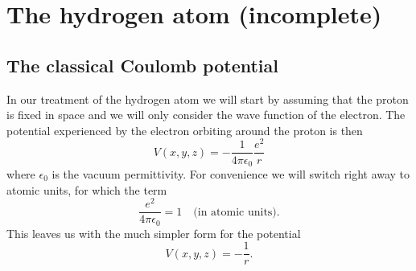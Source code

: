 \documentclass[../Main/chem331-notes.tex]{subfiles}
\begin{document}
\setcounter{section}{12}

\section{The hydrogen atom (incomplete)}
\subsection{The classical Coulomb potential}
In our treatment of the hydrogen atom we will start by assuming that the proton is fixed in space and we will only consider the wave function of the electron. The potential experienced by the electron orbiting around the proton is then
\begin{equation}
V(x,y,z) = - \frac{1}{4 \pi \epsilon_0} \frac{e^2}{r}
\end{equation}
where $\epsilon_0$ is the vacuum permittivity.
For convenience we will switch right away to atomic units, for which the term
\begin{equation}
\frac{e^2}{4 \pi \epsilon_0} = 1 \quad \text{(in atomic units)}.
\end{equation}
This leaves us with the much simpler form for the potential
\begin{equation}
V(x,y,z) = - \frac{1}{r}.
\end{equation}
\end{document}
